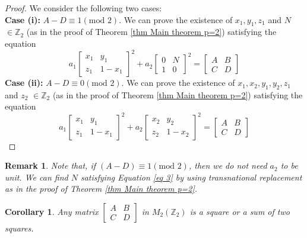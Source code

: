 \documentclass[12pt,a4paper]{article}
\newtheorem{cor}{Corollary}[section]
\newtheorem{rem}{Remark}[section]
\begin{document}
	\begin{proof}
		We consider the following two cases: \\
		\textbf{Case (i): } $A-D \equiv 1 (\mbox{mod }2)$. We can prove the existence of $x_1,y_1,z_1$ and $N$ $\in \mathbb{Z}_2$ (as in the proof of Theorem \ref{thm Main theorem p=2}) satisfying the equation
		\begin{equation*} \label{eq 3}
			a_1 \begin{bmatrix}
				x_1 & y_1  \\
				z_1 & 1-x_1  
			\end{bmatrix}^2  +a_2\begin{bmatrix}
				0 & N \\
				1 & 0
			\end{bmatrix}^2 = \begin{bmatrix}
				A & B \\
				C & D
			\end{bmatrix}
		\end{equation*} 
		\textbf{Case (ii): }$A-D \equiv0 (\mbox{mod }2)$. We can prove the existence of $x_1,x_2,y_1,y_2,z_1$ and $z_2$ $\in \mathbb{Z}_2$ (as in the proof of Theorem \ref{thm Main theorem p=2}) satisfying the equation
		\begin{equation*} \label{eq 4}
			a_1 \begin{bmatrix}
				x_1 & y_1  \\
				z_1 & 1-x_1  
			\end{bmatrix}^2  + a_2 \begin{bmatrix}
				x_2 & y_2  \\
				z_2 & 1-x_2
				
			\end{bmatrix}^2 = \begin{bmatrix}
				A & B \\
				C & D
			\end{bmatrix}
		\end{equation*}
	\end{proof}
	\begin{rem}
		Note that, if $(A-D) \equiv 1 (\mbox{mod }2)$, then we do not need $a_2$ to be unit.  We can find $N$ satisfying Equation \eqref{eq 3} by using transnational replacement as in the proof of Theorem \ref{thm Main theorem p=2}.
	\end{rem}
	\begin{cor} \label{Cor matrix as a sum of squares p=2}
		Any matrix $\begin{bmatrix}
			A & B \\
			C & D
		\end{bmatrix}$ in $M_2(\mathbb{Z}_2)$ is a square or a sum of two squares.
	\end{cor}
\end{document}
